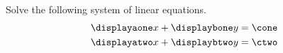 









\pgfmathtruncatemacro{\money}{\lcmy/\bone}
\pgfmathtruncatemacro{\mtwoy}{\lcmy/\btwo}


\pgfmathtruncatemacro{\maone}{\money*\aone}
\pgfmathtruncatemacro{\matwo}{\mtwoy*\atwo}


\pgfmathtruncatemacro{\cone}{\aone*\x+\bone*\y}
\pgfmathtruncatemacro{\ctwo}{\atwo*\x+\btwo*\y}


\pgfmathtruncatemacro{\monecone}{\money*\cone}
\pgfmathtruncatemacro{\mtwoctwo}{\mtwoy*\ctwo}


\pgfmathtruncatemacro{\coefx}{\maone-\matwo}

\pgfmathtruncatemacro{\cthree}{\monecone-\mtwoctwo}


\pgfmathtruncatemacro{\aonetimesx}{\aone*\x}


\pgfmathtruncatemacro{\coneminusaonex}{\cone-\aone*\x}




\setcounter{equation}{0}



Solve the following system of linear equations.
\begin{align}
\displayaone x + \displaybone y &= \cone  \label{eq-I005-1}\\
\displayatwo x + \displaybtwo y &= \ctwo  \label{eq-I005-2}
\end{align}

